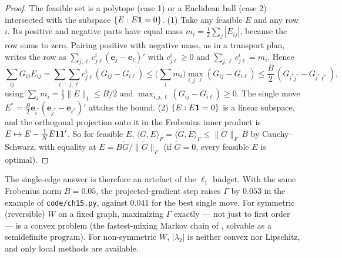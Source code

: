 \documentclass[../structural_economics_book.tex]{subfiles}
\begin{document}
\begin{proof}
The feasible set is a polytope (case 1) or a Euclidean ball (case 2) intersected with the subspace $\{E: E\mathbf{1} = 0\}$. (1) Take any feasible $E$ and any row $i$. Its positive and negative parts have equal mass $m_i = \frac12\sum_j |E_{ij}|$, because the row sums to zero. Pairing positive with negative mass, as in a transport plan, writes the row as $\sum_{j,\ell} c^i_{j\ell}(\mathbf{e}_j - \mathbf{e}_\ell)'$ with $c^i_{j\ell} \geq 0$ and $\sum_{j,\ell} c^i_{j\ell} = m_i$. Hence
\[
\textstyle\sum_{ij}G_{ij}E_{ij} = \sum_i\sum_{j,\ell} c^i_{j\ell}(G_{ij} - G_{i\ell}) \leq \Big(\sum_i m_i\Big)\max_{i,j,\ell}(G_{ij} - G_{i\ell}) \leq \frac{B}{2}\,(G_{i^*j^*} - G_{i^*\ell^*}),
\]
using $\sum_i m_i = \frac12\|E\|_1 \leq B/2$ and $\max_{i,j,\ell}(G_{ij} - G_{i\ell}) \geq 0$. The single move $E^* = \frac{B}{2}\mathbf{e}_{i^*}(\mathbf{e}_{j^*} - \mathbf{e}_{\ell^*})'$ attains the bound. (2) $\{E : E\mathbf{1} = 0\}$ is a linear subspace, and the orthogonal projection onto it in the Frobenius inner product is $E \mapsto E - \frac1N E\mathbf{1}\mathbf{1}'$. So for feasible $E$, $\langle G, E\rangle_F = \langle \tilde G, E\rangle_F \leq \|\tilde G\|_F\,B$ by Cauchy--Schwarz, with equality at $E = B\tilde G/\|\tilde G\|_F$ (if $\tilde G = 0$, every feasible $E$ is optimal).
\end{proof}

The single-edge answer is therefore an artefact of the $\ell_1$ budget. With the same Frobenius norm $B = 0.05$, the projected-gradient step raises $\Gamma$ by $0.053$ in the example of \texttt{code/ch15.py}, against $0.041$ for the best single move. For symmetric (reversible) $W$ on a fixed graph, maximizing $\Gamma$ exactly --- not just to first order --- is a convex problem (the fastest-mixing Markov chain of \citealp*{boyd2004fastest}, solvable as a semidefinite program). For non-symmetric $W$, $|\lambda_2|$ is neither convex nor Lipschitz, and only local methods are available.
\end{document}
